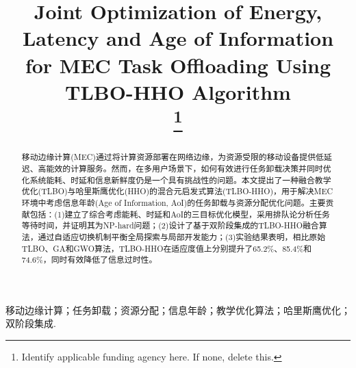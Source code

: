 \documentclass[conference]{IEEEtran}
\begin{document}
\title{Joint Optimization of Energy, Latency and Age of Information for MEC Task Offloading Using TLBO-HHO Algorithm\\
\thanks{Identify applicable funding agency here. If none, delete this.}
}

\author{
\and
{}
\and
{}
}

\maketitle

\begin{abstract}
移动边缘计算(MEC)通过将计算资源部署在网络边缘，为资源受限的移动设备提供低延迟、高能效的计算服务。然而，在多用户场景下，如何有效进行任务卸载决策并同时优化系统能耗、时延和信息新鲜度仍是一个具有挑战性的问题。本文提出了一种融合教学优化(TLBO)与哈里斯鹰优化(HHO)的混合元启发式算法(TLBO-HHO)，用于解决MEC环境中考虑信息年龄(Age of Information, AoI)的任务卸载与资源分配优化问题。主要贡献包括：(1)建立了综合考虑能耗、时延和AoI的三目标优化模型，采用排队论分析任务等待时间，并证明其为NP-hard问题；(2)设计了基于双阶段集成的TLBO-HHO融合算法，通过自适应切换机制平衡全局探索与局部开发能力；(3)实验结果表明，相比原始TLBO、GA和GWO算法，TLBO-HHO在适应度值上分别提升了65.2\%、85.4\%和74.6\%，同时有效降低了信息过时性。
\end{abstract}

\begin{IEEEkeywords}
移动边缘计算；任务卸载；资源分配；信息年龄；教学优化算法；哈里斯鹰优化；双阶段集成.
\end{IEEEkeywords}
\end{document}
